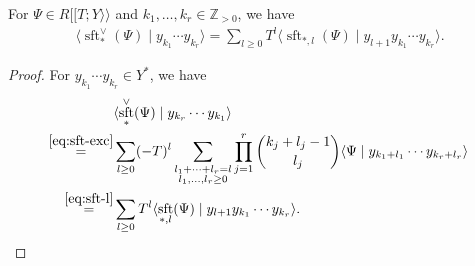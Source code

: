 \documentclass[15pt,oneside,reqno]{amsart}
\theoremstyle{remark}{
\newtheorem{lem}[df]{Lemma}
\newtheorem{prop}[df]{Proposition}
\newtheorem{ex}[df]{Example}
\newtheorem{rmk}[df]{Remark}
}
\DeclareMathOperator{\sft}{sft}
\begin{document}
\begin{prop}
For $\Psi \in R[[T ;  Y \rangle\rangle$ and $k_1,\ldots,k_r \in \mathbb{Z}_{>0}$, we have
\begin{align}
\langle \sft_*^{\vee}(\Psi) \mid  y_{k_1}\cdots y_{k_r} \rangle = \sum_{l\ge 0} T^l \langle \sft_{*,l} (\Psi) \mid y_{l+1}y_{k_1}\cdots y_{k_r} \rangle. \label{eq:sft-vee-l}
\end{align}
\end{prop}

\begin{proof}
For $y_{k_1}\cdots y_{k_r} \in Y^*$, we have
\begin{align*}
&\langle \sft_{*}^{\vee}(\Psi) \mid y_{k_r}\cdots y_{k_1} \rangle\\
\stackrel{\eqref{eq:sft-exc}}{=}&  \sum_{l\ge 0} (-T)^l
\sum_{\substack{l_1 + \cdots +l_r = l \\ l_1,\ldots, l_r\ge 0}}
\prod_{j=1}^r \binom{k_j + l_j -1}{l_j}
\langle\Psi \mid y_{k_1+l_1}\cdots y_{k_r+l_r} \rangle\, \\
\stackrel{\eqref{eq:sft-l}}{=}& \sum_{l\ge 0} T^l \langle \sft_{*,l}(\Psi)\mid y_{l+1}y_{k_1}\cdots y_{k_r} \rangle.
\end{align*}
\end{proof}
\end{document}
